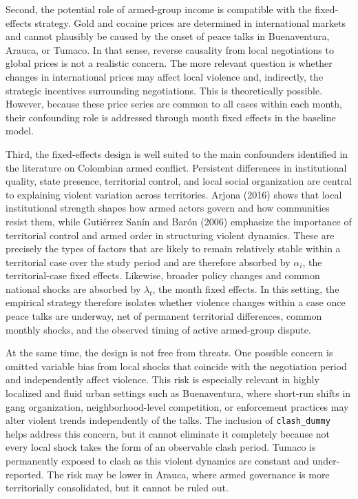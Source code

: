 \documentclass[11pt]{article}
\begin{document}
Second, the potential role of armed-group income is compatible with the fixed-effects strategy. Gold and cocaine prices are determined in international markets and cannot plausibly be caused by the onset of peace talks in Buenaventura, Arauca, or Tumaco. In that sense, reverse causality from local negotiations to global prices is not a realistic concern. The more relevant question is whether changes in international prices may affect local violence and, indirectly, the strategic incentives surrounding negotiations. This is theoretically possible. However, because these price series are common to all cases within each month, their confounding role is addressed through month fixed effects in the baseline model.

Third, the fixed-effects design is well suited to the main confounders identified in the literature on Colombian armed conflict. Persistent differences in institutional quality, state presence, territorial control, and local social organization are central to explaining violent variation across territories. Arjona (2016) shows that local institutional strength shapes how armed actors govern and how communities resist them, while Gutiérrez Sanín and Barón (2006) emphasize the importance of territorial control and armed order in structuring violent dynamics. These are precisely the types of factors that are likely to remain relatively stable within a territorial case over the study period and are therefore absorbed by $\alpha_i$, the territorial-case fixed effects. Likewise, broader policy changes and common national shocks are absorbed by $\lambda_t$, the month fixed effects. In this setting, the empirical strategy therefore isolates whether violence changes within a case once peace talks are underway, net of permanent territorial differences, common monthly shocks, and the observed timing of active armed-group dispute.

At the same time, the design is not free from threats. One possible concern is omitted variable bias from local shocks that coincide with the negotiation period and independently affect violence. This risk is especially relevant in highly localized and fluid urban settings such as Buenaventura, where short-run shifts in gang organization, neighborhood-level competition, or enforcement practices may alter violent trends independently of the talks. The inclusion of \texttt{clash\_dummy} helps address this concern, but it cannot eliminate it completely because not every local shock takes the form of an observable clash period. Tumaco is permanently exposed to clash as this violent dynamics are constant and under-reported. The risk may be lower in Arauca, where armed governance is more territorially consolidated, but it cannot be ruled out. 
\end{document}

